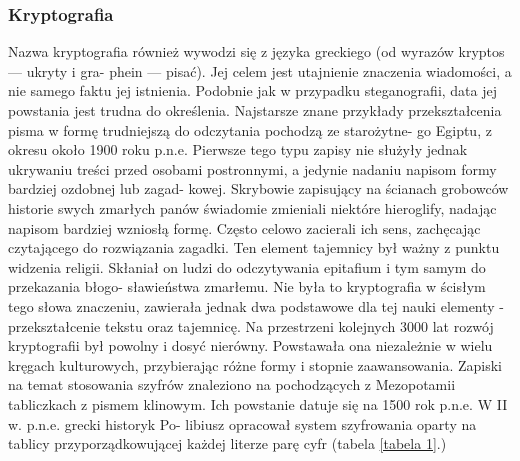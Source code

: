 \documentclass[a4paper]{article}
\begin{document}
\subsubsection{Kryptografia}
Nazwa kryptografia również wywodzi się z języka greckiego (od wyrazów kryptos — ukryty i gra-
phein — pisać). Jej celem jest utajnienie znaczenia wiadomości, a nie samego faktu jej istnienia.
Podobnie jak w przypadku steganografii, data jej powstania jest trudna do określenia. Najstarsze
znane przykłady przekształcenia pisma w formę trudniejszą do odczytania pochodzą ze starożytne-
go Egiptu, z okresu około 1900 roku p.n.e. Pierwsze tego typu zapisy nie służyły jednak ukrywaniu
treści przed osobami postronnymi, a jedynie nadaniu napisom formy bardziej ozdobnej lub zagad-
kowej. Skrybowie zapisujący na ścianach grobowców historie swych zmarłych panów świadomie
zmieniali niektóre hieroglify, nadając napisom bardziej wzniosłą formę. Często celowo zacierali ich
sens, zachęcając czytającego do rozwiązania zagadki. Ten element tajemnicy był ważny z punktu
widzenia religii. Skłaniał on ludzi do odczytywania epitafium i tym samym do przekazania błogo-
sławieństwa zmarłemu. Nie była to kryptografia w ścisłym tego słowa znaczeniu, zawierała jednak
dwa podstawowe dla tej nauki elementy - przekształcenie tekstu oraz tajemnicę.
Na przestrzeni kolejnych 3000 lat rozwój kryptografii był powolny i dosyć nierówny. Powstawała
ona niezależnie w wielu kręgach kulturowych, przybierając różne formy i stopnie zaawansowania.
Zapiski na temat stosowania szyfrów znaleziono na pochodzących z Mezopotamii tabliczkach z
pismem klinowym. Ich powstanie datuje się na 1500 rok p.n.e. W II w. p.n.e. grecki historyk Po-
libiusz opracował system szyfrowania oparty na tablicy przyporządkowującej każdej literze parę
cyfr (tabela \ref{tabela 1}.)
\end{document}
